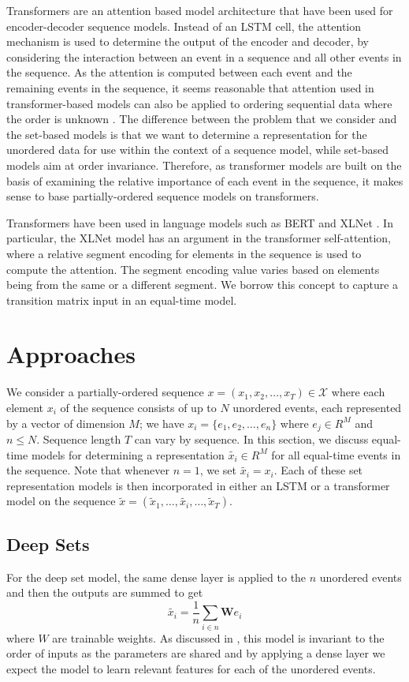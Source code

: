 \documentclass[reqno ,11pt]{article}
\begin{document}
Transformers are an attention based model architecture that have been used for encoder-decoder sequence models. Instead of an LSTM cell, the attention mechanism is used to determine the output of the encoder and decoder, by considering the interaction between an event in a sequence and all other events in the sequence. As the attention is computed between each event and the remaining events in the sequence, it seems reasonable that attention used in transformer-based models can also be applied to ordering sequential data where the order is unknown \cite{transformer}. The difference between the problem that we consider and the set-based models is that we want to determine a representation for the unordered data for use within the context of a sequence model, while set-based models aim at order invariance. Therefore, as transformer models are built on the basis of examining the relative importance of each event in the sequence, it makes sense to base partially-ordered sequence models on transformers.

Transformers have been used in language models such as BERT and XLNet \cite{bert, xlnet}. In particular, the XLNet model has an argument in the transformer self-attention, where a relative segment encoding for elements in the sequence is used to compute the attention. The segment encoding value varies based on elements being from the same or a different segment. We borrow this concept to capture a transition matrix input in an equal-time model. 

\section{Approaches}
We consider a partially-ordered sequence $x = (x_1, x_2, \dots, x_T) \in \mathcal{X}$ where each element $x_i$ of the sequence consists of up to $N$ unordered events, each represented by a vector of dimension $M$; we have $x_i = \{e_1, e_2, \dots, e_n\}$ where $e_j \in R^M$ and $n \le N$. Sequence length $T$ can vary by sequence. In this section, we discuss equal-time models for determining a representation $\tilde{x_i} \in R^M$ for all equal-time events in the sequence. Note that whenever $n = 1$, we set $\tilde{x_i} = x_i$. Each of these set representation models is then incorporated in either an LSTM or a transformer model on the sequence $\tilde{x} = (\tilde{x}_1, \dots, \tilde{x_i}, \dots, \tilde{x}_T)$.

\subsection{Deep Sets}
For the deep set model, the same dense layer is applied to the $n$ unordered events and then the outputs are summed to get \[\tilde{x_i} = \frac1n\sum_{i\in n} \mathbf{W}e_i\] where $W$ are trainable weights. As discussed in \cite{deep-sets}, this model is invariant to the order of inputs as the parameters are shared and by applying a dense layer we expect the model to learn relevant features for each of the unordered events.
\end{document}
